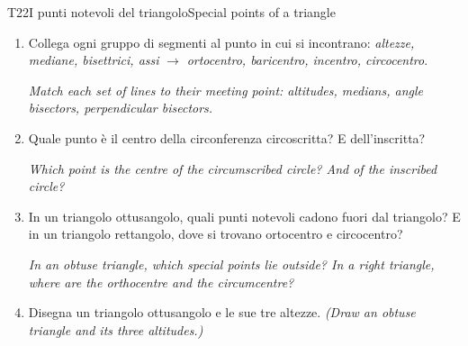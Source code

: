 \documentclass[11pt,a4paper]{article}
\newcommand{\en}[1]{\par{\small\itshape\color{engray}#1\par}}
\newcommand{\enx}[1]{{\small\itshape\color{engray}(#1)}}
\begin{document}
\begin{esercizio}{T2}{2}{I punti notevoli del triangolo}{Special points of a triangle}
\begin{enumerate}
\item Collega ogni gruppo di segmenti al punto in cui si incontrano: \emph{altezze, mediane, bisettrici, assi} $\to$ \emph{ortocentro, baricentro, incentro, circocentro}.
\en{Match each set of lines to their meeting point: altitudes, medians, angle bisectors, perpendicular bisectors.}
\item Quale punto è il centro della circonferenza circoscritta? E dell'inscritta?
\en{Which point is the centre of the circumscribed circle? And of the inscribed circle?}
\item In un triangolo ottusangolo, quali punti notevoli cadono fuori dal triangolo? E in un triangolo rettangolo, dove si trovano ortocentro e circocentro?
\en{In an obtuse triangle, which special points lie outside? In a right triangle, where are the orthocentre and the circumcentre?}
\item Disegna un triangolo ottusangolo e le sue tre altezze. \enx{Draw an obtuse triangle and its three altitudes.}
\end{enumerate}
\end{esercizio}
\end{document}
